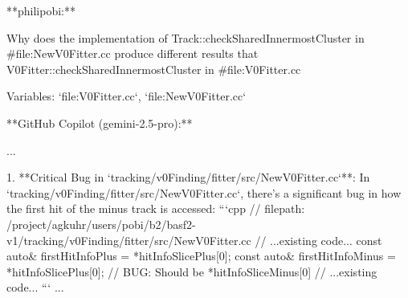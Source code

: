 \raggedright
\begin{markdown}    
**philipobi:**  

Why does the implementation of Track::checkSharedInnermostCluster in #file:NewV0Fitter.cc produce different results that V0Fitter::checkSharedInnermostCluster in #file:V0Fitter.cc 

Variables: `file:V0Fitter.cc`, `file:NewV0Fitter.cc`
\end{markdown}
\tcblower
\raggedright
\begin{markdown}
**GitHub Copilot (gemini-2.5-pro):**  

...

1.  **Critical Bug in `tracking/v0Finding/fitter/src/NewV0Fitter.cc`**:
    In `tracking/v0Finding/fitter/src/NewV0Fitter.cc`, there's a significant bug in how the first hit of the minus track is accessed:
    ```cpp
    // filepath: /project/agkuhr/users/pobi/b2/basf2-v1/tracking/v0Finding/fitter/src/NewV0Fitter.cc
    // ...existing code...
    const auto& firstHitInfoPlus = *hitInfoSlicePlus[0];
    const auto& firstHitInfoMinus = *hitInfoSlicePlus[0]; // BUG: Should be *hitInfoSliceMinus[0]
    // ...existing code...
    ```
...
\end{markdown}